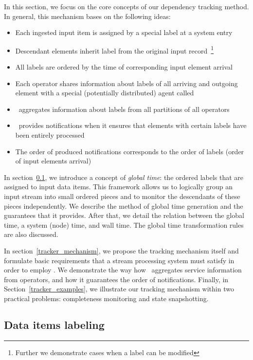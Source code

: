 \label{fs-acker-design}

In this section, we focus on the core concepts of our dependency tracking method. In general, this mechanism bases on the following ideas:
\begin{itemize}
    \item Each ingested input item is assigned by a special label at a system entry
    \item Descendant elements inherit label from the original input record~\footnote{Further we demonstrate cases when a label can be modified}
    \item All labels are ordered by the time of corresponding input element arrival 
    \item Each operator shares information about labels of all arriving and outgoing element with a special (potentially distributed) agent called {\em \tracker}
    \item \tracker\ aggregates information about labels from all partitions of all operators
    \item \tracker\ provides notifications when it ensures that elements with certain labels have been entirely processed
    \item The order of produced notifications corresponds to the order of labels (order of input elements arrival)
\end{itemize}

In section~\ref{labeling}, we introduce a concept of {\em global time}: the ordered labels that are assigned to input data items. This framework allows us to logically group an input stream into small ordered pieces and to monitor the descendants of these pieces independently. We describe the method of global time generation and the guarantees that it provides. After that, we detail the relation between the global time, a system (node) time, and wall time. The global time transformation rules are also discussed.

In section~\ref{tracker_mechanism}, we propose the tracking mechanism itself and formulate basic requirements that a stream processing system must satisfy in order to employ \tracker . We demonstrate the way how \tracker\ aggregates service information from operators, and how it guarantees the order of notifications. Finally, in Section~\ref{tracker_examples}, we illustrate our tracking mechanism within two practical problems: completeness monitoring and state snapshotting.

\subsection{Data items labeling} \label{labeling}


